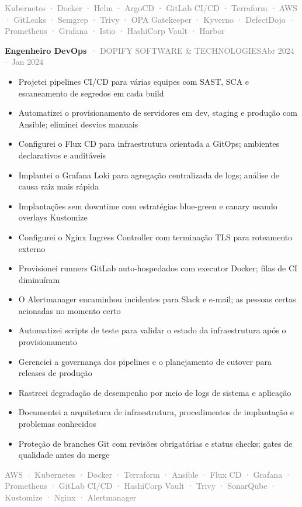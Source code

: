 \documentclass[10pt,a4paper]{article}
\newcommand{\cventry}[3]{\textbf{#1}\ \textcolor{graytext}{· #2}\hfill\textcolor{graytext}{\small #3}\par}
\newcommand{\tagline}[1]{\textcolor{graytext}{\small #1}\par}
\begin{document}
\tagline{Kubernetes · Docker · Helm · ArgoCD · GitLab CI/CD · Terraform · AWS · GitLeaks · Semgrep · Trivy · OPA Gatekeeper · Kyverno · DefectDojo · Prometheus · Grafana · Istio · HashiCorp Vault · Harbor}
\vspace{1pt}
\vspace{3pt}
\cventry{Engenheiro DevOps}{DOPIFY SOFTWARE \& TECHNOLOGIES}{Abr 2024 – Jan 2024}
\begin{itemize}
  \item Projetei pipelines CI/CD para várias equipes com SAST, SCA e escaneamento de segredos em cada build
  \item Automatizei o provisionamento de servidores em dev, staging e produção com Ansible; eliminei desvios manuais
  \item Configurei o Flux CD para infraestrutura orientada a GitOps; ambientes declarativos e auditáveis
  \item Implantei o Grafana Loki para agregação centralizada de logs; análise de causa raiz mais rápida
  \item Implantações sem downtime com estratégias blue-green e canary usando overlays Kustomize
  \item Configurei o Nginx Ingress Controller com terminação TLS para roteamento externo
  \item Provisionei runners GitLab auto-hospedados com executor Docker; filas de CI diminuíram
  \item O Alertmanager encaminhou incidentes para Slack e e-mail; as pessoas certas acionadas no momento certo
  \item Automatizei scripts de teste para validar o estado da infraestrutura após o provisionamento
  \item Gerenciei a governança dos pipelines e o planejamento de cutover para releases de produção
  \item Rastreei degradação de desempenho por meio de logs de sistema e aplicação
  \item Documentei a arquitetura de infraestrutura, procedimentos de implantação e problemas conhecidos
  \item Proteção de branches Git com revisões obrigatórias e status checks; gates de qualidade antes do merge
\end{itemize}
\tagline{AWS · Kubernetes · Docker · Terraform · Ansible · Flux CD · Grafana · Prometheus · GitLab CI/CD · HashiCorp Vault · Trivy · SonarQube · Kustomize · Nginx · Alertmanager}
\vspace{1pt}
\vspace{3pt}
\end{document}
